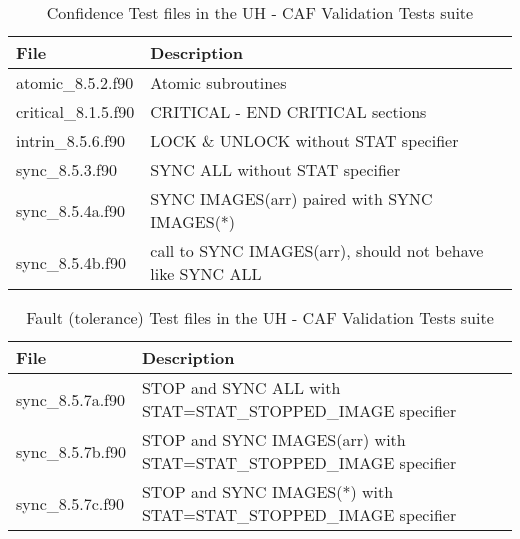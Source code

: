 \begin{table}[h]
\small
\caption{Confidence Test files in the UH - CAF Validation Tests suite}
\label{tab:confidence_files}
\begin{tabular}{|l|p{8cm}|}
\hline
File & Description \\ \hline
atomic\_8.5.2.f90 & Atomic subroutines\\ \hline
critical\_8.1.5.f90 & CRITICAL - END CRITICAL sections\\ \hline
intrin\_8.5.6.f90  & LOCK \& UNLOCK without STAT specifier\\ \hline
sync\_8.5.3.f90  & SYNC ALL without STAT specifier\\ \hline
sync\_8.5.4a.f90 & SYNC IMAGES(arr) paired with SYNC IMAGES(*)\\ \hline
sync\_8.5.4b.f90 & call to SYNC IMAGES(arr), should not behave like SYNC ALL\\ \hline
\hline
\end{tabular}
\end{table}

\begin{table}[h]
\small
\caption{Fault (tolerance) Test files in the UH - CAF Validation Tests suite}
\label{tab:fault_files}
\begin{tabular}{|l|p{8cm}|}
\hline
File & Description \\ \hline
sync\_8.5.7a.f90 & STOP and SYNC ALL with STAT=STAT\_STOPPED\_IMAGE specifier\\ \hline
sync\_8.5.7b.f90 & STOP and SYNC IMAGES(arr) with STAT=STAT\_STOPPED\_IMAGE specifier\\ \hline
sync\_8.5.7c.f90 &  STOP and SYNC IMAGES(*) with STAT=STAT\_STOPPED\_IMAGE specifier\\ \hline
\end{tabular}
\end{table}


